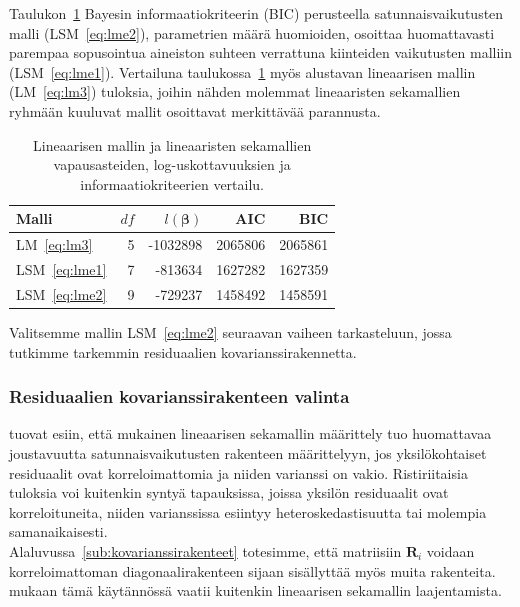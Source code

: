 \documentclass[finnish]{docopts}
\begin{document}
Taulukon~\ref{table:lme_summary} Bayesin informaatiokriteerin (BIC) perusteella satunnaisvaikutusten malli (LSM~\ref{eq:lme2}), parametrien määrä huomioiden, osoittaa huomattavasti parempaa sopusointua aineiston suhteen verrattuna kiinteiden vaikutusten malliin (LSM~\ref{eq:lme1}). Vertailuna taulukossa~\ref{table:lme_summary} myös alustavan lineaarisen mallin (LM~\ref{eq:lm3}) tuloksia, joihin nähden molemmat lineaaristen sekamallien ryhmään kuuluvat mallit osoittavat merkittävää parannusta. \\

\begin{table}[H]
\centering
\begin{tabular}{lrrrr}
\toprule
Malli & $df$ & $l(\bm{\beta})$ & AIC & BIC\\
\midrule
LM~\ref{eq:lm3} & 5 & -1032898 & 2065806 & 2065861\\
LSM~\ref{eq:lme1} & 7 & -813634 & 1627282 & 1627359\\
LSM~\ref{eq:lme2} & 9 & -729237 & 1458492 & 1458591\\
\bottomrule
\end{tabular}
\caption{Lineaarisen mallin ja lineaaristen sekamallien vapausasteiden, log-uskottavuuksien ja informaatiokriteerien vertailu.}
\label{table:lme_summary}
\end{table}

Valitsemme mallin LSM~\ref{eq:lme2} seuraavan vaiheen tarkasteluun, jossa tutkimme tarkemmin residuaalien kovarianssirakennetta.

\subsubsection{Residuaalien kovarianssirakenteen valinta}
\label{ssb:reskovar}

\cite{pinheiro00} tuovat esiin, että \cite{laird82} mukainen lineaarisen sekamallin määrittely tuo huomattavaa joustavuutta satunnaisvaikutusten rakenteen määrittelyyn, jos yksilökohtaiset residuaalit ovat korreloimattomia ja niiden varianssi on vakio. Ristiriitaisia tuloksia voi kuitenkin syntyä tapauksissa, joissa yksilön residuaalit ovat korreloituneita, niiden varianssissa esiintyy heteroskedastisuutta tai molempia samanaikaisesti.\\

Alaluvussa~\ref{sub:kovarianssirakenteet} totesimme, että matriisiin $\bm{R}_i$ voidaan korreloimattoman diagonaalirakenteen sijaan sisällyttää myös muita rakenteita. \cite{pinheiro00} mukaan tämä käytännössä vaatii kuitenkin lineaarisen sekamallin laajentamista.\\
\end{document}
